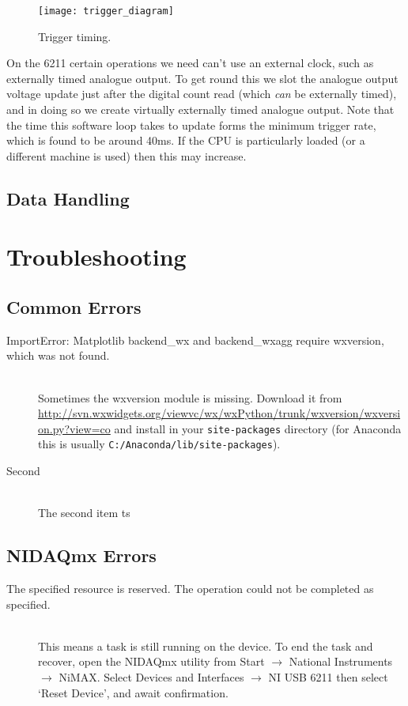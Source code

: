 \documentclass[10pt,a4paper]{article}
\begin{document}
\begin{figure}[h!]

  \centering
    \texttt{[image: trigger\_diagram]}
      \caption{Trigger timing.}
\end{figure}

On the 6211 certain operations we need can't use an external clock, such as externally timed analogue output. To get round this we slot the analogue output voltage update just after the digital count read (which \textit{can} be externally timed), and in doing so we create virtually externally timed analogue output. Note that the time this software loop takes to update forms the minimum trigger rate, which is found to be around 40ms. If the CPU is particularly loaded (or a different machine is used) then this may increase.

\subsection{Data Handling}

\section{Troubleshooting}
\subsection{Common Errors}
\begin{description}
  \item[ImportError: Matplotlib backend\_wx and backend\_wxagg require wxversion, which was not found.] \hfill \\
  Sometimes the wxversion module is missing. Download it from \url{http://svn.wxwidgets.org/viewvc/wx/wxPython/trunk/wxversion/wxversion.py?view=co} and install in your \texttt{site-packages} directory (for Anaconda this is usually \texttt{C:/Anaconda/lib/site-packages}).
  \item[Second] \hfill \\
  The second item
ts
\end{description}
\subsection{NIDAQmx Errors}
\begin{description}
\item[The specified resource is reserved. The operation could not be completed as specified.] \hfill \\
This means a task is still running on the device. To end the task and recover, open the NIDAQmx utility from Start $\rightarrow$ National Instruments $\rightarrow$ NiMAX. Select Devices and Interfaces $\rightarrow$ NI USB 6211 then select `Reset Device', and await confirmation.
\end{description}
\end{document}
